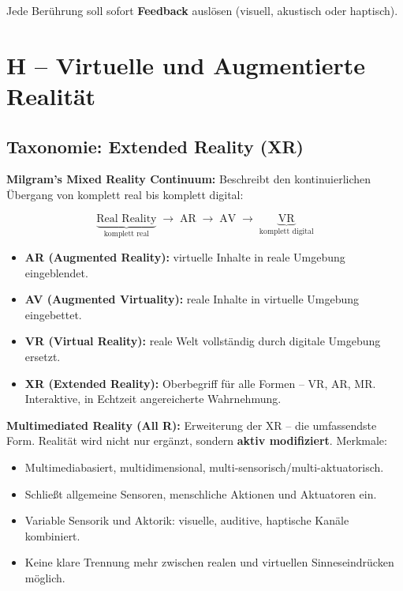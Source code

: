 \documentclass[12pt, a4paper]{article}
\begin{document}
Jede Berührung soll sofort \textbf{Feedback} auslösen (visuell, akustisch oder haptisch).

\section{H -- Virtuelle und Augmentierte Realität}

\subsection{Taxonomie: Extended Reality (XR)}

\textbf{Milgram's Mixed Reality Continuum:} Beschreibt den kontinuierlichen Übergang von komplett real bis komplett digital:

\[
  \underbrace{\text{Real Reality}}_{\text{komplett real}}
  \;\longrightarrow\;
  \text{AR}
  \;\longrightarrow\;
  \text{AV}
  \;\longrightarrow\;
  \underbrace{\text{VR}}_{\text{komplett digital}}
\]

\begin{itemize}
  \item \textbf{AR (Augmented Reality):} virtuelle Inhalte in reale Umgebung eingeblendet.
  \item \textbf{AV (Augmented Virtuality):} reale Inhalte in virtuelle Umgebung eingebettet.
  \item \textbf{VR (Virtual Reality):} reale Welt vollständig durch digitale Umgebung ersetzt.
  \item \textbf{XR (Extended Reality):} Oberbegriff für alle Formen -- VR, AR, MR. Interaktive, in Echtzeit angereicherte Wahrnehmung.
\end{itemize}

\textbf{Multimediated Reality (All R):} Erweiterung der XR -- die umfassendste Form. Realität wird nicht nur ergänzt, sondern \textbf{aktiv modifiziert}. Merkmale:
\begin{itemize}
  \item Multimediabasiert, multidimensional, multi-sensorisch/multi-aktuatorisch.
  \item Schließt allgemeine Sensoren, menschliche Aktionen und Aktuatoren ein.
  \item Variable Sensorik und Aktorik: visuelle, auditive, haptische Kanäle kombiniert.
  \item Keine klare Trennung mehr zwischen realen und virtuellen Sinneseindrücken möglich.
\end{itemize}
\end{document}
